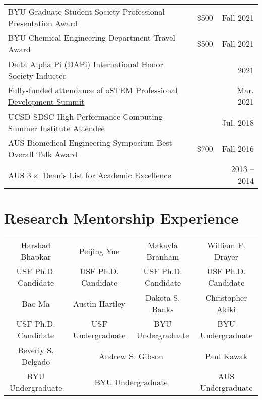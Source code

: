 \documentclass[letterpaper,11pt]{article}
\begin{document}
\begin{longtable}{@{}p{} p{} r@{}}
  BYU Graduate Student Society Professional Presentation Award               									& \$500 & Fall 2021 \\[3.5pt] %
  BYU Chemical Engineering Department Travel Award                           									& \$500 & Fall 2021 \\[3.5pt] %
  Delta Alpha Pi (DAPi) International Honor Society Inductee                 									& & 2021 \\[3.5pt]
  Fully-funded attendance of oSTEM \href{https://ostem.org/page/professional-development-summit}{Professional Development Summit}           	& & Mar. 2021 \\[3.5pt]
  UCSD SDSC High Performance Computing Summer Institute Attendee             									& & Jul. 2018 \\[3.5pt]
  AUS Biomedical Engineering Symposium Best Overall Talk Award               									& \$700 & Fall 2016 \\[3.5pt]
  AUS $3\times$ Dean's List for Academic Excellence                          									& & 2013 -- 2014 \\[3.5pt]
\end{longtable}
\vspace{3ex}

\vspace{-2.5\baselineskip}
\section*{Research Mentorship Experience}
\vspace{-0.5\baselineskip}
\begin{longtable}{ c c c c }
  Harshad Bhapkar 	& Peijing Yue 		& Makayla Branham 	& William F. Drayer 	\\
  USF Ph.D. Candidate   & USF Ph.D. Candidate 	& USF Ph.D. Candidate 	& USF Ph.D. Candidate 	\\[4pt]
  Bao Ma 		& Austin Hartley	& Dakota S. Banks 	& Christopher Akiki	\\
  USF Ph.D. Candidate 	& USF Undergraduate 	& BYU Undergraduate	& BYU Undergraduate	\\[4pt]
  Beverly S. Delgado 	& \multicolumn{2}{c}{Andrew S. Gibson} 		& Paul Kawak 		\\
  BYU Undergraduate	& \multicolumn{2}{c}{BYU Undergraduate}		& AUS Undergraduate 	\\[4pt]
\end{longtable}
\vspace{3ex}
\end{document}
